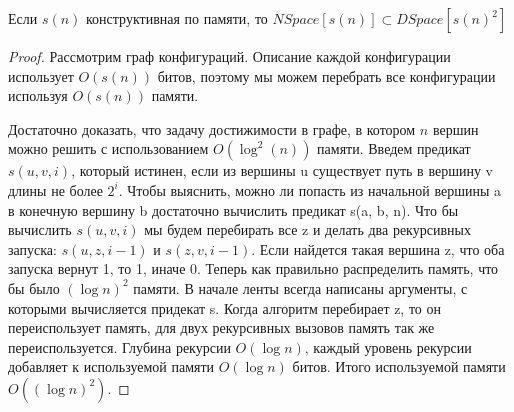 \begin{theorem}
	Если $s(n)$ конструктивная по памяти, то 
	$NSpace[s(n)] \subset DSpace[s(n)^2]$
\end{theorem}
\begin{proof}
	Рассмотрим граф конфигураций. Описание каждой конфигурации использует
	$O(s(n))$ битов, поэтому мы можем перебрать все конфигурации используя
	$O(s(n))$ памяти.

	Достаточно доказать, что задачу достижимости в графе, в котором
	$n$ вершин можно решить с использованием $O(\log^2(n))$ памяти.
	Введем предикат $s(u, v, i)$, который истинен, если из вершины u
	существует путь в вершину v длины не более $2^i$. Чтобы выяснить, 
	можно ли попасть из начальной вершины a в конечную вершину b достаточно 
	вычислить предикат s(a, b, n). Что бы вычислить 
	$s(u, v,i)$ мы будем перебирать все z и делать два рекурсивных запуска:
	$s(u, z, i - 1)$ и $s(z, v, i - 1)$. Если найдется такая вершина z, что 
	оба запуска вернут 1, то 1, иначе 0. Теперь как правильно распределить 
	память, что бы было $(\log n)^2$ памяти. В начале ленты всегда написаны 
	аргументы, с которыми вычисляется придекат s. Когда алгоритм 
	перебирает z, то он переиспользует память, для двух рекурсивных 
	вызовов память так же переиспользуется. Глубина рекурсии $O(\log n)$, 
	каждый уровень рекурсии добавляет к используемой памяти $O(\log n)$ битов. 
	Итого используемой памяти $O((\log n)^2)$. 
\end{proof}